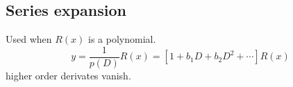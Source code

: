 \documentclass[oneside,11pt,pdftex,final]{book}%
\numberwithin{equation}{section}
\newtheorem{example}[theorem]{Example}
\numberwithin{section}{chapter}
\numberwithin{equation}{chapter}
\begin{document}
%
%


\subsection{Series expansion}
Used when $ R(x) $ is a polynomial.
\[ y=\frac{1}{p(D)} R(x) = [1+b_1D+b_2D^2+\cdots]R(x)\] higher order derivates vanish.

\end{document}
